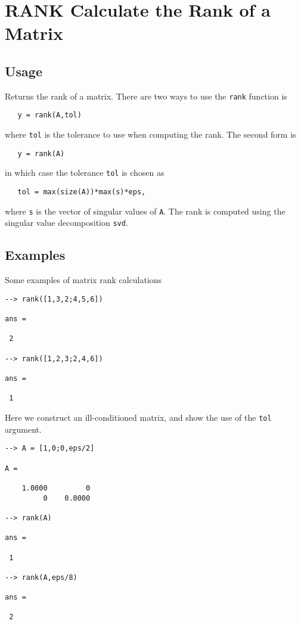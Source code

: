 \section{RANK Calculate the Rank of a Matrix}

\subsection{Usage}

Returns the rank of a matrix.  There are two ways to use
the \verb|rank| function is
\begin{verbatim}
   y = rank(A,tol)
\end{verbatim}
where \verb|tol| is the tolerance to use when computing the
rank.  The second form is
\begin{verbatim}
   y = rank(A)
\end{verbatim}
in which case the tolerance \verb|tol| is chosen as
\begin{verbatim}
   tol = max(size(A))*max(s)*eps,
\end{verbatim}
where \verb|s| is the vector of singular values of \verb|A|.  The
rank is computed using the singular value decomposition \verb|svd|.
\subsection{Examples}

Some examples of matrix rank calculations
\begin{verbatim}
--> rank([1,3,2;4,5,6])

ans = 

 2 

--> rank([1,2,3;2,4,6])

ans = 

 1 
\end{verbatim}
Here we construct an ill-conditioned matrix, and show the use 
of the \verb|tol| argument.
\begin{verbatim}
--> A = [1,0;0,eps/2]

A = 

    1.0000         0 
         0    0.0000 

--> rank(A)

ans = 

 1 

--> rank(A,eps/8)

ans = 

 2 
\end{verbatim}
